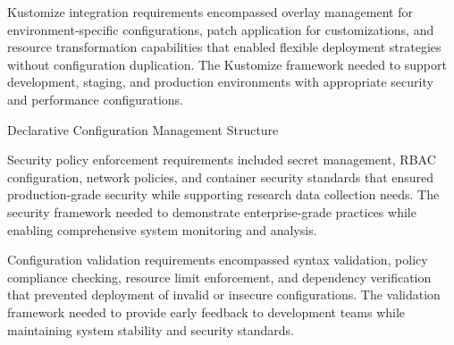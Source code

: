 Kustomize integration requirements encompassed overlay management for environment-specific configurations, patch application for customizations, and resource transformation capabilities that enabled flexible deployment strategies without configuration duplication. The Kustomize framework needed to support development, staging, and production environments with appropriate security and performance configurations.

\begin{table}[H]
\centering
\caption{Declarative Configuration Management Structure}
\label{tab:declarative-config-structure}
\end{table}

Security policy enforcement requirements included secret management, RBAC configuration, network policies, and container security standards that ensured production-grade security while supporting research data collection needs. The security framework needed to demonstrate enterprise-grade practices while enabling comprehensive system monitoring and analysis.

Configuration validation requirements encompassed syntax validation, policy compliance checking, resource limit enforcement, and dependency verification that prevented deployment of invalid or insecure configurations. The validation framework needed to provide early feedback to development teams while maintaining system stability and security standards.